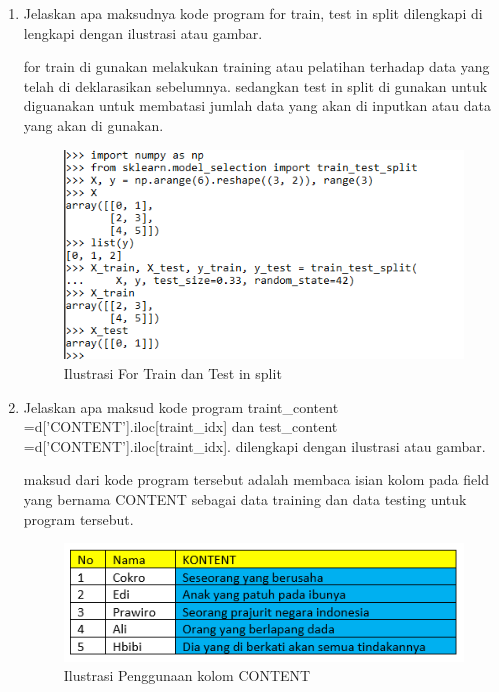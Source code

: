 \begin{enumerate}
\item Jelaskan apa maksudnya kode program for train, test in split dilengkapi di lengkapi dengan ilustrasi atau gambar.\par
for train di gunakan melakukan training atau pelatihan terhadap data yang telah di deklarasikan sebelumnya. sedangkan test in split di gunakan untuk diguanakan untuk membatasi jumlah data yang akan di inputkan atau data yang akan di gunakan.
\begin{figure}[ht]
\centering
\includegraphics[scale=0.4]{figures/1174042/chapter7/1,3.PNG}
\caption{Ilustrasi For Train dan Test in split}
\label{Contoh}
\end{figure}


\item Jelaskan apa maksud kode program traint\_content =d['CONTENT'].iloc[traint\_idx] dan test\_content =d['CONTENT'].iloc[traint\_idx]. dilengkapi dengan ilustrasi atau gambar.\par
maksud dari kode program tersebut adalah membaca isian kolom pada field yang bernama CONTENT sebagai data training dan data testing untuk program tersebut.
\begin{figure}[ht]
\centering
\includegraphics[scale=0.4]{figures/1174042/chapter7/1,4.PNG}
\caption{Ilustrasi Penggunaan kolom CONTENT}
\label{Contoh}
\end{figure}



\end{enumerate}
